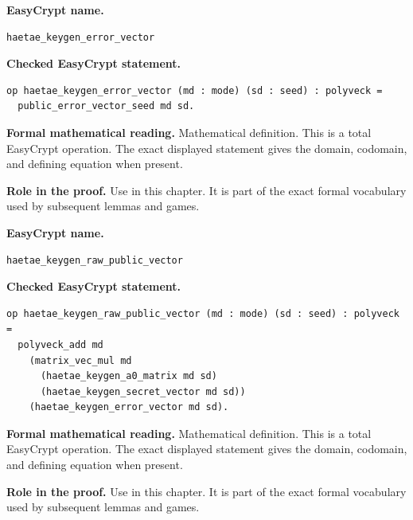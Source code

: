\begin{formaldefinition}
\noindent\textbf{EasyCrypt name.}
\begin{lstlisting}[language=EasyCrypt,basicstyle=\ttfamily\scriptsize]
haetae_keygen_error_vector
\end{lstlisting}
\noindent\textbf{Checked EasyCrypt statement.}
\begin{lstlisting}[language=EasyCrypt,basicstyle=\ttfamily\scriptsize]
op haetae_keygen_error_vector (md : mode) (sd : seed) : polyveck =
  public_error_vector_seed md sd.
\end{lstlisting}
\noindent\textbf{Formal mathematical reading.}
Mathematical definition. This is a total EasyCrypt operation.  The exact displayed statement gives the domain, codomain, and defining equation when present.

\noindent\textbf{Role in the proof.}
Use in this chapter. It is part of the exact formal vocabulary used by subsequent lemmas and games.

\end{formaldefinition}

\begin{formaldefinition}
\noindent\textbf{EasyCrypt name.}
\begin{lstlisting}[language=EasyCrypt,basicstyle=\ttfamily\scriptsize]
haetae_keygen_raw_public_vector
\end{lstlisting}
\noindent\textbf{Checked EasyCrypt statement.}
\begin{lstlisting}[language=EasyCrypt,basicstyle=\ttfamily\scriptsize]
op haetae_keygen_raw_public_vector (md : mode) (sd : seed) : polyveck =
  polyveck_add md
    (matrix_vec_mul md
      (haetae_keygen_a0_matrix md sd)
      (haetae_keygen_secret_vector md sd))
    (haetae_keygen_error_vector md sd).
\end{lstlisting}
\noindent\textbf{Formal mathematical reading.}
Mathematical definition. This is a total EasyCrypt operation.  The exact displayed statement gives the domain, codomain, and defining equation when present.

\noindent\textbf{Role in the proof.}
Use in this chapter. It is part of the exact formal vocabulary used by subsequent lemmas and games.

\end{formaldefinition}

